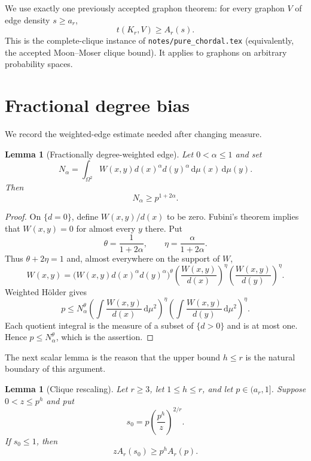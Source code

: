 \documentclass[11pt]{article}
\newtheorem{lemma}[theorem]{Lemma}
\newcommand{\dd}{\,\mathrm d}
\begin{document}
We use exactly one previously accepted graphon theorem: for every graphon
$V$ of edge density $s\geq a_r$,
\begin{equation}
 t(K_r,V)\geq A_r(s).
 \label{eq:clique-input}
\end{equation}
This is the complete-clique instance of
\texttt{notes/pure\_chordal.tex} (equivalently, the accepted Moon--Moser
clique bound).  It applies to graphons on arbitrary probability spaces.


\section{Fractional degree bias}

We record the weighted-edge estimate needed after changing measure.

\begin{lemma}[Fractionally degree-weighted edge]
\label{lem:fractional-edge}
Let $0<\alpha\leq1$ and set
\[
 N_\alpha
 =\int_{\Omega^2}W(x,y)d(x)^\alpha d(y)^\alpha
   \dd\mu(x)\dd\mu(y).
\]
Then
\[
 N_\alpha\geq p^{1+2\alpha}.
\]
\end{lemma}

\begin{proof}
On $\{d=0\}$, define $W(x,y)/d(x)$ to be zero.  Fubini's theorem implies
that $W(x,y)=0$ for almost every $y$ there.  Put
\[
 \theta=\frac1{1+2\alpha},
 \qquad
 \eta=\frac{\alpha}{1+2\alpha}.
\]
Thus $\theta+2\eta=1$ and, almost everywhere on the support of $W$,
\[
 W(x,y)
 =\bigl(W(x,y)d(x)^\alpha d(y)^\alpha\bigr)^\theta
  \left(\frac{W(x,y)}{d(x)}\right)^\eta
  \left(\frac{W(x,y)}{d(y)}\right)^\eta.
\]
Weighted H\"older gives
\[
 p\leq N_\alpha^\theta
 \left(\int\frac{W(x,y)}{d(x)}\dd\mu^2\right)^\eta
 \left(\int\frac{W(x,y)}{d(y)}\dd\mu^2\right)^\eta.
\]
Each quotient integral is the measure of a subset of $\{d>0\}$ and is at
most one.  Hence $p\leq N_\alpha^\theta$, which is the assertion.
\end{proof}

The next scalar lemma is the reason that the upper bound $h\leq r$ is the
natural boundary of this argument.

\begin{lemma}[Clique rescaling]
\label{lem:scalar}
Let $r\geq3$, let $1\leq h\leq r$, and let $p\in(a_r,1]$.  Suppose
$0<z\leq p^h$ and put
\[
 s_0=p\left(\frac{p^h}{z}\right)^{2/r}.
\]
If $s_0\leq1$, then
\[
 zA_r(s_0)\geq p^hA_r(p).
\]
\end{lemma}
\end{document}
